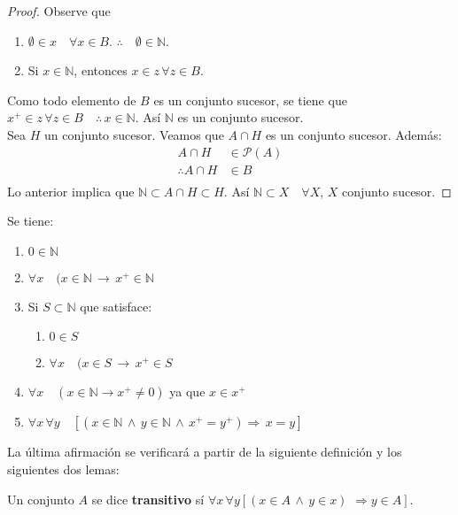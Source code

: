     \begin{proof}
        Observe que 
        \begin{enumerate}
            \item $\emptyset \in x \quad \forall x \in B$. $\therefore \quad \emptyset
                \in \mathbb{N}$.
            \item Si $x \in \mathbb{N}$, entonces $x \in z \, \forall z \in B$.
        \end{enumerate}
        Como todo elemento de $B$ es un conjunto sucesor, se tiene que $x^+ \in
        z \, \forall z \in B \quad \therefore \, x \in \mathbb{N}$. Así
        $\mathbb{N}$ es un conjunto sucesor.  \\
        Sea $H$ un conjunto sucesor. Veamos que $A\cap H$ es un conjunto
        sucesor. Además:
        \begin{align*}
            A \cap H &\in \mathcal{P}(A) \\
            \therefore A \cap H &\in B \\
        \end{align*}
        Lo anterior implica que $\mathbb{N} \subset A \cap H \subset H$.
        Así $\mathbb{N} \subset X \quad \forall X $, $X$ conjunto sucesor.
    \end{proof}
    Se tiene:
    \begin{enumerate}
        \item $ 0 \in \mathbb{N}$
        \item $ \forall x \quad (x \in \mathbb{N} \, \rightarrow \,x^+ \in
            \mathbb{N} $
        \item Si $S \subset \mathbb{N}$ que satisface:
            \begin{enumerate}
                \item $ 0 \in S$
                \item $ \forall x \quad (x \in S \, \rightarrow \,x^+ \in S$
            \end{enumerate}
        \item $\forall x \quad ( x \in \mathbb{N} \rightarrow x^+ \neq 0 )$ ya
            que $ x \in x^+$
        \item $\forall x \, \forall y \quad [(x \in \mathbb{N} \, \land \, y \in
            \mathbb{N} \, \land \, x^+ = y^+ ) \Rightarrow \, x = y]$
    \end{enumerate}
    La última afirmación se verificará a partir de la siguiente definición y los
    siguientes dos lemas:
    \begin{definition}
        Un conjunto $A$ se dice \textbf{transitivo} sí $\forall x \, \forall y [
        (x \in A \, \land \, y \in x ) \, \, \Rightarrow y \in A]$.
    \end{definition}
